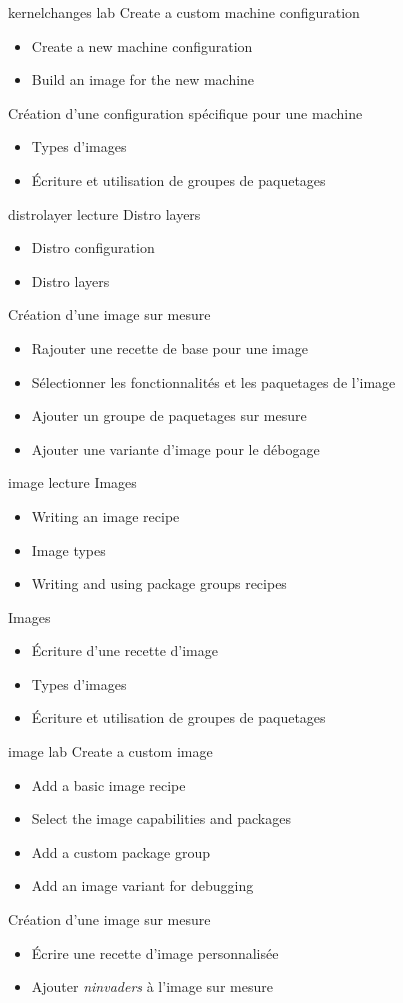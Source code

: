 {kernelchanges}
{lab}
{Create a custom machine configuration}
{
  \begin{itemize}
  \item Create a new machine configuration
  \item Build an image for the new machine
  \end{itemize}
}
{Création d'une configuration spécifique pour une machine}
{
  \begin{itemize}
  \item Types d'images
  \item Écriture et utilisation de groupes de paquetages
  \end{itemize}
}

{distrolayer}
{lecture}
{Distro layers}
{
  \begin{itemize}
  \item Distro configuration
  \item Distro layers
  \end{itemize}
}
{Création d'une image sur mesure}
{
  \begin{itemize}
  \item Rajouter une recette de base pour une image
  \item Sélectionner les fonctionnalités et les paquetages de l'image
  \item Ajouter un groupe de paquetages sur mesure
  \item Ajouter une variante d'image pour le débogage
  \end{itemize}
}

{image}
{lecture}
{Images}
{
  \begin{itemize}
  \item Writing an image recipe
  \item Image types
  \item Writing and using package groups recipes
  \end{itemize}
}
{Images}
{
  \begin{itemize}
  \item Écriture d’une recette d’image
  \item Types d’images
  \item Écriture et utilisation de groupes de paquetages
  \end{itemize}
}

{image}
{lab}
{Create a custom image}
{
  \begin{itemize}
  \item Add a basic image recipe
  \item Select the image capabilities and packages
  \item Add a custom package group
  \item Add an image variant for debugging
  \end{itemize}
}
{Création d'une image sur mesure}
{
  \begin{itemize}
  \item Écrire une recette d'image personnalisée
  \item Ajouter {\em ninvaders} à l'image sur mesure
  \end{itemize}
}

